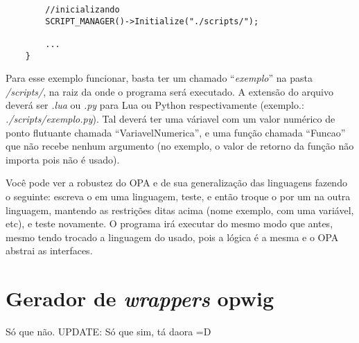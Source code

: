 \begin{enumerate}
\begin{lstlisting}
        //inicializando
        SCRIPT_MANAGER()->Initialize("./scripts/");
        
        ...
    }
    \end{lstlisting}
    
    Para esse exemplo funcionar, basta ter um \script{} chamado ``\textit{exemplo}''
    na pasta \textit{/scripts/}, na raiz da onde o programa será executado. A extensão
    do arquivo deverá ser \textit{.lua} ou \textit{.py} para Lua ou Python respectivamente
    (exemplo.: \textit{./scripts/exemplo.py}). Tal \script{} deverá ter uma váriavel
    com um valor numérico de ponto flutuante chamada ``VariavelNumerica'', e uma função
    chamada ``Funcao'' que não recebe nenhum argumento (no exemplo, o valor de retorno da
    função não importa pois não é usado).
    
    Você pode ver a robustez do OPA e de sua generalização das linguagens fazendo o seguinte:
    escreva o \script{} em uma linguagem, teste, e então troque o \script{} por um na
    outra linguagem, mantendo as restrições ditas acima (nome exemplo,  com uma variável, etc),
    e teste novamente. O programa irá executar do mesmo modo que antes, mesmo tendo trocado a
    linguagem do \script{} usado, pois a lógica é a mesma e o OPA abstrai as interfaces.
  
\end{enumerate}


\section{Gerador de \emph{wrappers} \textbf{opwig}}

Só que não. 
UPDATE: Só que sim, tá daora =D
